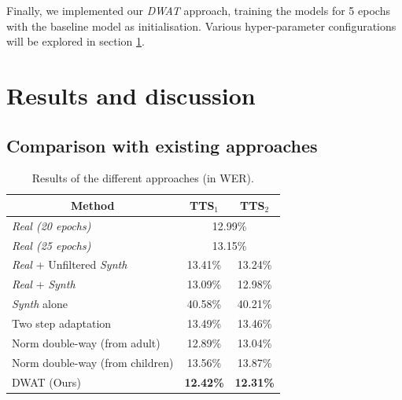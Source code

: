 Finally, we implemented our \textit{\ac{DWAT}} approach, training the models for 5 epochs with the baseline model as initialisation. Various hyper-parameter configurations will be explored in section \ref{section:exp_DWAT}.

\section{Results and discussion}
\label{section:exp_DWAT}

\subsection{Comparison with existing approaches}

\begin{table}[t]
\centering
\begin{tabular}{ccc}
\hline
 Method & TTS$_1$ & TTS$_2$  \\ \hline
\multicolumn{1}{l}{\textit{Real (20 epochs)}} & \multicolumn{2}{c}{12.99\%}\\ 
\multicolumn{1}{l}{\textit{Real (25 epochs)}} & \multicolumn{2}{c}{13.15\%}\\ \hline
\multicolumn{1}{l}{\textit{Real} + Unfiltered \textit{Synth}}  &   13.41\%  & 13.24\% \\ 
\multicolumn{1}{l}{\textit{Real} + \textit{Synth} \cite{wang2021towards}} & 13.09\% & 12.98\% \\
\multicolumn{1}{l}{\textit{Synth} alone}    & 40.58\%  & 40.21\%  \\
\multicolumn{1}{l}{Two step adaptation}    & 13.49\%  & 13.46\%  \\
\hline
\multicolumn{1}{l}{Norm double-way (from adult)} & 12.89\% & 13.04\% \\ 
\multicolumn{1}{l}{Norm double-way (from children)} & 13.56\% & 13.87\% \\ \hline
\multicolumn{1}{l}{DWAT (Ours)} &\textbf{ 12.42\%} & \textbf{12.31\%} \\ \hline
\end{tabular}

\caption{Results of the different approaches (in WER).}
\label{tab:res_DWAT}
\end{table}

